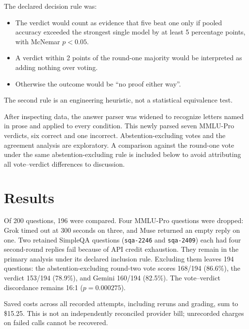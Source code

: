 \documentclass[11pt]{article}
\begin{document}
The declared decision rule was:
\begin{itemize}
  \item The verdict would count as evidence that five beat one only if pooled accuracy exceeded the strongest single model by at least 5 percentage points, with McNemar $p<0.05$.
  \item A verdict within 2 points of the round-one majority would be interpreted as adding nothing over voting.
  \item Otherwise the outcome would be ``no proof either way''.
\end{itemize}
The second rule is an engineering heuristic, not a statistical equivalence test.

After inspecting data, the answer parser was widened to recognize letters named in prose and applied to every condition. This newly parsed seven MMLU-Pro verdicts, six correct and one incorrect. Abstention-excluding votes and the agreement analysis are exploratory. A comparison against the round-one vote under the same abstention-excluding rule is included below to avoid attributing all vote--verdict differences to discussion.

\section{Results}

Of 200 questions, 196 were compared. Four MMLU-Pro questions were dropped: Grok timed out at 300 seconds on three, and Muse returned an empty reply on one. Two retained SimpleQA questions (\texttt{sqa-2246} and \texttt{sqa-2409}) each had four second-round replies fail because of API credit exhaustion. They remain in the primary analysis under its declared inclusion rule. Excluding them leaves 194 questions: the abstention-excluding round-two vote scores 168/194 (86.6\%), the verdict 153/194 (78.9\%), and Gemini 160/194 (82.5\%). The vote--verdict discordance remains 16:1 ($p=0.000275$).

Saved costs across all recorded attempts, including reruns and grading, sum to \$15.25. This is not an independently reconciled provider bill; unrecorded charges on failed calls cannot be recovered.
\end{document}
